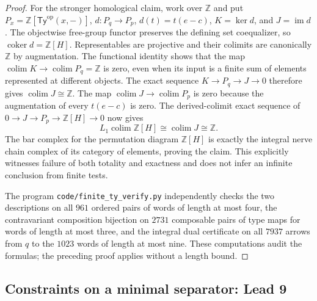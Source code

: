 \begin{proof}
For the stronger homological claim, work over $\mathbb Z$ and put
$P_x=\mathbb Z[\mathsf{Ty}^{\mathrm{op}}(x,-)]$,
$d:P_q\to P_p$, $d(t)=t(e-c)$, $K=\ker d$, and $J=\operatorname{im}d$.
The objectwise free-group functor preserves the defining set
coequalizer, so $\operatorname{coker}d=\mathbb Z[H]$. Representables
are projective and their colimits are canonically $\mathbb Z$ by
augmentation. The functional identity shows that the map
$\operatorname{colim}K\to\operatorname{colim}P_q=\mathbb Z$ is zero,
even when its input is a finite sum of elements represented at different
objects. The exact sequence
$K\to P_q\to J\to0$ therefore gives
$\operatorname{colim}J\cong\mathbb Z$. The map
$\operatorname{colim}J\to\operatorname{colim}P_p$ is zero because the
augmentation of every $t(e-c)$ is zero. The derived-colimit exact
sequence of $0\to J\to P_p\to\mathbb Z[H]\to0$ now gives
\[
 L_1\operatorname{colim}\mathbb Z[H]
 \cong\operatorname{colim}J\cong\mathbb Z.
\]
The bar complex for the permutation diagram $\mathbb Z[H]$ is exactly
the integral nerve chain complex of its category of elements, proving
the claim. This explicitly witnesses failure of both totality and
exactness and does not infer an infinite conclusion from finite tests.

The program \texttt{code/finite\_ty\_verify.py} independently checks the
two descriptions on all $961$ ordered pairs of words of length at most
four, the contravariant composition bijection on $2731$ composable pairs
of type maps for words of length at most three, and the integral dual
certificate on all $7937$ arrows from $q$ to the $1023$ words of length
at most nine. These computations audit the formulas; the preceding
proof applies without a length bound.
\end{proof}

\subsection{Constraints on a minimal separator: Lead 9}

